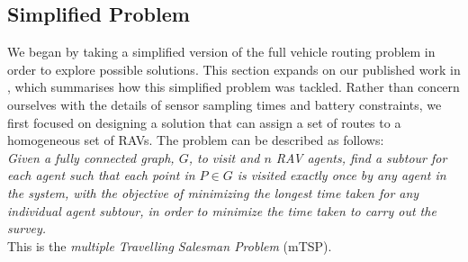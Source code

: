\subsection{Simplified Problem}\label{subsec:SimplifiedVRP}
We began by taking a simplified version of the full vehicle routing problem in order to explore possible solutions. This section expands on our published work in \cite{Smyth2018UsingDrones}, which summarises how this simplified problem was tackled. Rather than concern ourselves with the details of sensor sampling times and battery constraints, we first focused on designing a solution that can assign a set of routes to a homogeneous set of RAVs. 
The problem can be described as follows:
\\
\textit{Given a fully connected graph, $G$, to visit and $n$ RAV agents, find a subtour for each agent such that each point in $P \in G$ is visited exactly once by any agent in the system, with the objective of minimizing the longest time taken for any individual agent subtour, in order to minimize the time taken to carry out the survey.}
\\
This is the \textit{multiple Travelling Salesman Problem} (mTSP). 


